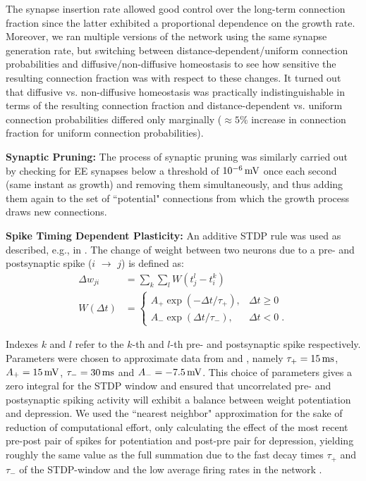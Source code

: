 \documentclass[10pt,letterpaper]{article}
\begin{document}
The synapse insertion rate allowed good control over the long-term connection fraction since the latter exhibited a proportional dependence on the growth rate. Moreover, we ran multiple versions of the network using the same synapse generation rate, but switching between distance-dependent/uniform connection probabilities and diffusive/non-diffusive homeostasis to see how sensitive the resulting connection fraction was with respect to these changes. It turned out that diffusive vs. non-diffusive homeostasis was practically indistinguishable in terms of the resulting connection fraction and distance-dependent vs. uniform connection probabilities differed only marginally ($\approx 5\%$ increase in connection fraction for uniform connection probabilities).

\textbf{Synaptic Pruning:} The process of synaptic pruning was similarly carried out by checking for EE synapses below a threshold of $\rm 10^{-6}\, mV$ once each second (same instant as growth) and removing them simultaneously, and thus adding them again to the set of ``potential" connections from which the growth process draws new connections.

\textbf{Spike Timing Dependent Plasticity:} An additive STDP rule was used as described, e.g., in \cite{Zhang_STDP}. The change of weight between two neurons due to a pre- and postsynaptic spike ($i$ $\rightarrow$ $j$) is defined as:
\begin{align}
\Delta w_{ji} &= \sum_k \sum_l W(t_j^l - t_i^k) \label{STDP_rule} \\
W(\Delta t) &= \begin{cases}
A_{+} \exp(-\Delta t / \tau_{+}), & \Delta t \geq 0  \\
A_{-} \exp(\Delta t / \tau_{-}), & \Delta t < 0 \; . \label{STDP_pos_neg}
\end{cases}
\end{align}



Indexes $k$ and $l$ refer to the $k$-th and $l$-th pre- and postsynaptic spike respectively. Parameters were chosen to approximate data from \cite{Bi_Poo_STDP} and \cite{Froemke_STDP}, namely $\tau_{+} = \rm 15\, ms$, $A_{+} =\rm 15\, mV$, $\tau_{-} =\rm 30\, ms$ and $A_{-} =\rm -7.5\, mV$. This choice of parameters gives a zero integral for the STDP window and ensured that uncorrelated pre- and postsynaptic spiking activity will exhibit a balance between weight potentiation and depression. We used the ``nearest neighbor" approximation for the sake of reduction of computational effort, only calculating the effect of the most recent pre-post pair of spikes for potentiation and post-pre pair for depression, yielding roughly the same value as the full summation due to the fast decay times $\tau_{+}$ and $\tau_{-}$ of the STDP-window and the low average firing rates in the network \cite{vanRossum_2000}.
\end{document}

